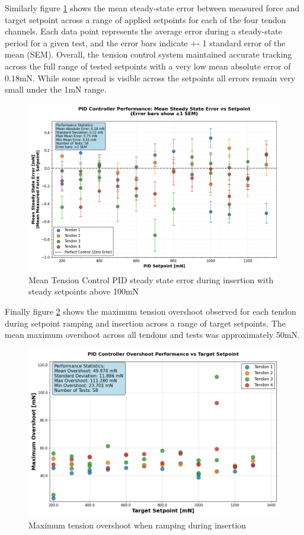 Similarly figure \ref{fig:steadtyStatePIDError} shows the mean steady-state error between measured force and target setpoint across a range of applied setpoints for each of the four tendon channels. Each data point represents the average error during a steady-state period for a given test, and the error bars indicate +- 1 standard error of the mean (SEM). Overall, the tension control system maintained accurate tracking across the full range of tested setpoints with a very low mean absolute error of 0.18mN. While some spread is visible across the setpoints all errors remain very small under the 1mN range.



\begin{figure} [H]
    \centering
    \includegraphics[width=0.9\linewidth]{images/PID performance/steadystateErrors.png}
    \caption{Mean Tension Control PID steady state error during insertion with steady setpoints above 100mN}
    \label{fig:steadtyStatePIDError}
\end{figure}

Finally figure \ref{fig:overshoot} shows the maximum tension overshoot observed for each tendon during setpoint ramping and insertion across a range of target setpoints. The mean maximum overshoot across all tendons and tests was approximately 50mN. 
\begin{figure}[H]
    \centering
    \includegraphics[width=0.9\linewidth]{images/PID performance/rampingOvershoot.png}
    \caption{Maximum tension overshoot when ramping during insertion}
    \label{fig:overshoot}
\end{figure}

